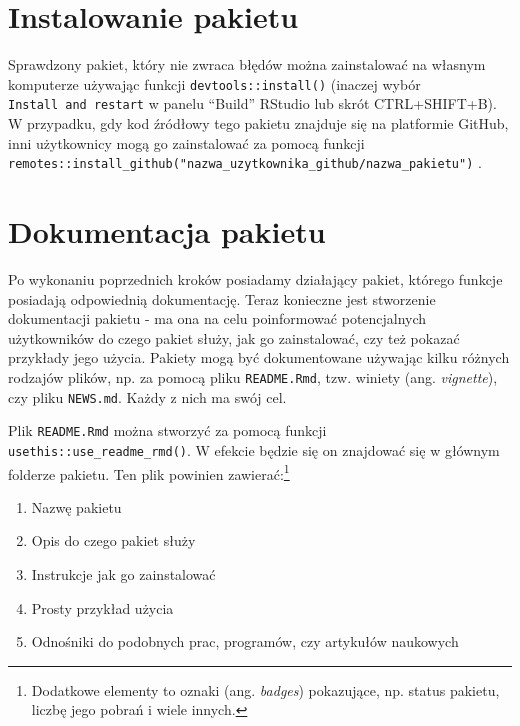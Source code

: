 \documentclass[paper=6in:9in,pagesize=pdftex,headinclude=on,footinclude=on,10pt]{scrbook}
\providecommand{\tightlist}{%
  \setlength{\itemsep}{0pt}\setlength{\parskip}{0pt}}
\begin{document}
\hypertarget{instalowanie-pakietu}{%
\section{Instalowanie pakietu}\label{instalowanie-pakietu}}

Sprawdzony pakiet, który nie zwraca błędów można zainstalować na własnym komputerze używając funkcji \texttt{devtools::install()} (inaczej wybór \texttt{Install\ and\ restart} w panelu ``Build'' RStudio lub skrót CTRL+SHIFT+B).
W przypadku, gdy kod źródłowy tego pakietu znajduje się na platformie GitHub, inni użytkownicy mogą go zainstalować za pomocą funkcji \texttt{remotes::install\_github("nazwa\_uzytkownika\_github/nazwa\_pakietu")} \citep{R-remotes}.

\hypertarget{dokumentacja-pakietu}{%
\section{Dokumentacja pakietu}\label{dokumentacja-pakietu}}

Po wykonaniu poprzednich kroków posiadamy działający pakiet, którego funkcje posiadają odpowiednią dokumentację.
Teraz konieczne jest stworzenie dokumentacji pakietu - ma ona na celu poinformować potencjalnych użytkowników do czego pakiet służy, jak go zainstalować, czy też pokazać przykłady jego użycia.
Pakiety mogą być dokumentowane używając kilku różnych rodzajów plików, np. za pomocą pliku \texttt{README.Rmd}, tzw. winiety (ang. \emph{vignette}), czy pliku \texttt{NEWS.md}.
Każdy z nich ma swój cel.

Plik \texttt{README.Rmd} można stworzyć za pomocą funkcji \texttt{usethis::use\_readme\_rmd()}.
W efekcie będzie się on znajdować się w głównym folderze pakietu.
Ten plik powinien zawierać:\footnote{Dodatkowe elementy to oznaki (ang. \emph{badges}) pokazujące, np. status pakietu, liczbę jego pobrań i wiele innych.}

\begin{enumerate}
\def\labelenumi{\arabic{enumi}.}
\tightlist
\item
  Nazwę pakietu
\item
  Opis do czego pakiet służy
\item
  Instrukcje jak go zainstalować
\item
  Prosty przykład użycia
\item
  Odnośniki do podobnych prac, programów, czy artykułów naukowych
\end{enumerate}
\end{document}
